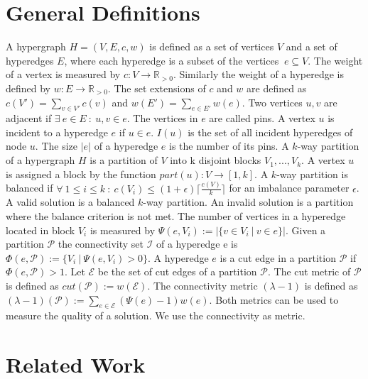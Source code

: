 \documentclass[a4paper,12pt,titlepage, BCOR7mm,headsepline]{scrbook}
\numberwithin{equation}{section}
\begin{document}
\section{General Definitions}

A hypergraph $H = (V, E, c, w)$ is defined as a set of vertices $V$ and a set of hyperedges $E$, where each hyperedge is a subset of the vertices $\ e \subseteq V$.
The weight of a vertex is measured by $c: V \rightarrow  \mathbb R_{> 0}$. Similarly the weight of a hyperedge is defined by $w: E \rightarrow  \mathbb R_{> 0}$. 
The set extensions of $c$ and $w$ are defined as $c(V') = \sum_{v \in V'} c(v)$ and $w(E') = \sum_{e \in E'} w(e)$. 
Two vertices $u, v$ are adjacent if $\exists\ e \in E\ :\ u, v \in e$. The vertices in $e$ are called pins. A vertex $u$ is incident to a hyperedge $e$ if $ u \in e$. $I(u)$ is the set of all incident hyperedges of node $u$. The size $|e|$ of a hyperedge $e$ is the number of its pins. A $k$-way partition of a hypergraph $H$ is a partition of $V$ into k disjoint blocks $V_1, ..., V_k$. A vertex $u$ is assigned a block by the function $part(u): V \rightarrow [1, k]$.
A $k$-way partition is balanced if $\forall\  1 \le i \le k\ :\ c(V_i) \le (1 + \epsilon) \lceil \frac{c(V)}{k} \rceil $ for an imbalance parameter $\epsilon$.
A valid solution is a balanced $k$-way partition. An invalid solution is a partition where the balance criterion is not met.
The number of vertices in a hyperedge located in block $V_i$ is measured by $\Psi(e,V_i) := |\{v \in V_i \ |\ v \in e \}|$. Given a partition $\mathcal{P}$ the connectivity set $\mathcal{I}$ of a hyperedge e is $\Phi(e, \mathcal{P}) :=  \{V_i\ |\ \Psi(e, V_i) > 0\}$. 
A hyperedge $e$ is a cut edge in a partition $\mathcal{P}$ if $\Phi(e, \mathcal{P}) > 1$. 
Let $\mathcal{E}$ be the set of cut edges of a partition $\mathcal{P}$. The cut metric of $\mathcal{P}$ is defined as $cut(\mathcal{P}) := w(\mathcal{E})$.
The connectivity metric $(\lambda - 1)$ is defined as $(\lambda - 1)(\mathcal{P}) := \sum_{e \in \mathcal{E}}(\Psi(e) - 1)w(e)$.
Both metrics can be used to measure the quality of a solution. We use the connectivity as metric. 





\section{Related Work}
\end{document}
